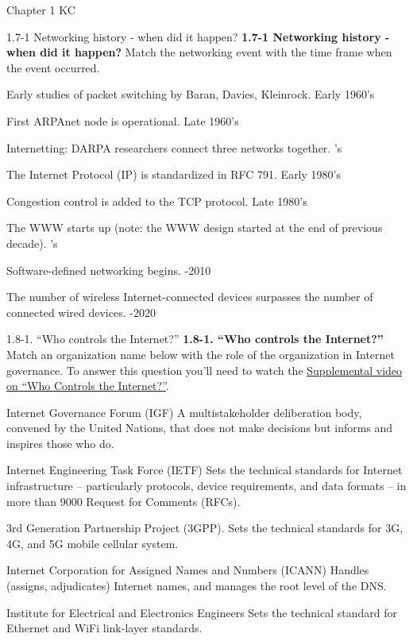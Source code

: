\documentclass[a4paper]{article}
\begin{document}
\begin{quiz}{Chapter 1 KC}
\begin{matching}[points=1]{1.7-1 Networking history - when did it happen?}
\textbf{1.7-1 Networking history - when did it happen?}
Match the networking event with the time frame when the event occurred.

\item Early studies of packet switching by Baran, Davies, Kleinrock. \answer Early 1960's
\item First ARPAnet node is operational. \answer Late 1960's
\item Internetting: DARPA researchers connect three networks together. 's
\item The Internet Protocol (IP) is standardized in RFC 791. \answer Early 1980's
\item Congestion control is added to the TCP protocol. \answer Late 1980's
\item The WWW starts up (note: the WWW design started at the end of previous decade). 's
\item Software-defined networking begins. -2010
\item The number of wireless Internet-connected devices surpasses the number of connected wired devices. -2020
\end{matching}

\begin{matching}[points=1]{1.8-1. ``Who controls the Internet?''}
\textbf{1.8-1. ``Who controls the Internet?''}
Match an organization name below with the role of the organization in Internet governance. 
To answer this question you'll need to watch the \href{https://www.youtube.com/watch?v=xrd4hD_9fS8}{Supplemental video on ``Who Controls the Internet?''}.

\item Internet Governance Forum (IGF) \answer A multistakeholder deliberation body, convened by the United Nations, that does not make decisions but informs and inspires those who do.
\item Internet Engineering Task Force (IETF) \answer Sets the technical standards for Internet infrastructure -- particularly protocols, device requirements, and data formats -- in more than 9000 Request for Comments (RFCs).
\item 3rd Generation Partnership Project (3GPP). \answer Sets the technical standards for 3G, 4G, and 5G mobile cellular system.
\item Internet Corporation for Assigned Names and Numbers (ICANN) \answer Handles (assigns, adjudicates) Internet names, and manages the root level of the DNS.
\item Institute for Electrical and Electronics Engineers \answer Sets the technical standard for Ethernet and WiFi link-layer standards.
\end{matching}


\end{quiz}
\end{document}
